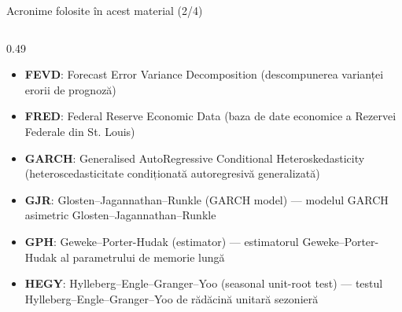 \begin{frame}{Acronime folosite în acest material (2/4)}
\begin{columns}[T]
\begin{column}{0.49\textwidth}
\begin{itemize}
    \item \textbf{FEVD}: Forecast Error Variance Decomposition (descompunerea varianței erorii de prognoză)
    \item \textbf{FRED}: Federal Reserve Economic Data (baza de date economice a Rezervei Federale din St. Louis)
    \item \textbf{GARCH}: Generalised AutoRegressive Conditional Heteroskedasticity (heteroscedasticitate condiționată autoregresivă generalizată)
    \item \textbf{GJR}: Glosten–Jagannathan–Runkle (GARCH model) — modelul GARCH asimetric Glosten–Jagannathan–Runkle
    \item \textbf{GPH}: Geweke–Porter-Hudak (estimator) — estimatorul Geweke–Porter-Hudak al parametrului de memorie lungă
    \item \textbf{HEGY}: Hylleberg–Engle–Granger–Yoo (seasonal unit-root test) — testul Hylleberg–Engle–Granger–Yoo de rădăcină unitară sezonieră
\end{itemize}
\end{column}
\end{columns}
\end{frame}
